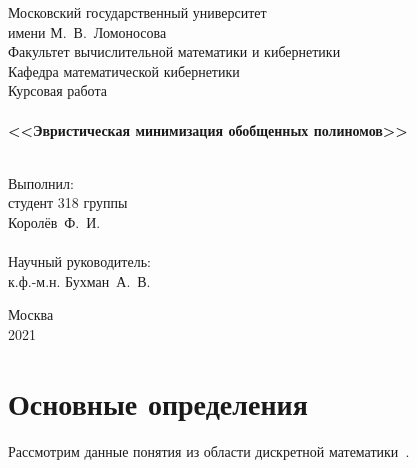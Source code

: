 \documentclass[a4paper,12pt,titlepage,finall]{article}
\begin{document}
\begin{titlepage}
    \begin{center}
    {\small \sc Московский государственный университет \\имени М.~В.~Ломоносова\\
    Факультет вычислительной математики и кибернетики\\Кафедра математической кибернетики\\}
    \vfill
    {\Large \sc Курсовая работа}\\
    ~\\
    {\large \bf <<Эвристическая минимизация обобщенных полиномов>>}\\
    ~\\
    \end{center}
    \begin{flushright}
    \vfill {Выполнил:\\
    студент 318 группы\\
    Королёв~Ф.~И.\\
    ~\\
    Научный руководитель:\\
    к.ф.-м.н. Бухман~А.~В.}
    \end{flushright}
    \begin{center}
    \vfill
    {\small Москва\\2021}
    \end{center}
\end{titlepage}

\tableofcontents
\newpage

\section{Основные определения}

Рассмотрим данные понятия из области дискретной математики~\cite{discrete}.
\end{document}
